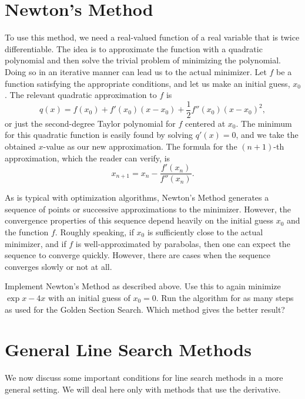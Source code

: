 \section{Newton's Method}
To use this method, we need a real-valued function of a real variable that is twice differentiable. The idea is to approximate the function with a quadratic polynomial and then solve the trivial problem of minimizing the polynomial. Doing so in an iterative manner can lead us to the actual minimizer. Let $f$ be a function satisfying the appropriate conditions, and let us make an initial guess, $x_0$. The relevant quadratic approximation to $f$ is $$q(x) = f(x_0) + f'(x_0)(x-x_0) + \frac{1}{2}f''(x_0)(x-x_0)^2,$$ or just the second-degree Taylor polynomial for $f$ centered at $x_0$. The minimum for this quadratic function is easily found by solving $q'(x) = 0$, and we take the obtained $x$-value as our new approximation. The formula for the $(n+1)$-th approximation, which the reader can verify, is $$x_{n+1} = x_n - \frac{f'(x_n)}{f''(x_n)}.$$

As is typical with optimization algorithms, Newton's Method generates a sequence of points or successive approximations to the minimizer. However, the convergence properties of this sequence depend heavily on the initial guess $x_0$ and the function $f$. Roughly speaking, if $x_0$ is sufficiently close to the actual minimizer, and if $f$ is well-approximated by parabolas, then one can expect the sequence to converge quickly. However, there are cases when the sequence converges slowly or not at all.

\begin{problem}
Implement Newton's Method as described above. Use this to again minimize $\exp{x} - 4x$ with an initial guess of $x_0 = 0$. Run the algorithm for as many steps as used for the Golden Section Search. Which method gives the better result?
\end{problem}

\section*{General Line Search Methods}
We now discuss some important conditions for line search methods in a more general setting. We will deal here only with methods that use the derivative.

